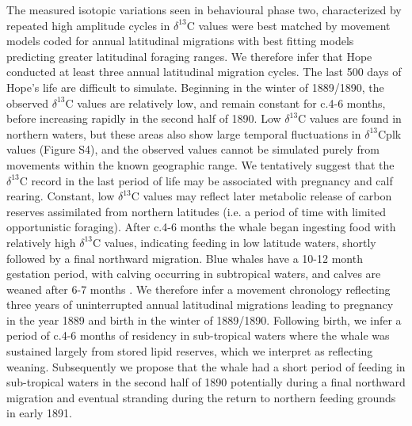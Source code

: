 \documentclass[a4paper,12pt]{article}
\begin{document}
The measured isotopic variations seen in behavioural phase two, characterized by repeated high amplitude cycles in $\delta^{13}$C values were best matched by movement models coded for annual latitudinal migrations with best fitting models predicting greater latitudinal foraging ranges. 
We therefore infer that Hope conducted at least three annual latitudinal migration cycles.
The last 500 days of Hope's life are difficult to simulate. 
Beginning in the winter of 1889/1890, the observed $\delta^{13}$C values are relatively low, and remain constant for c.4-6 months, before increasing rapidly in the second half of 1890. Low $\delta^{13}$C values are found in northern waters, but these areas also show large temporal fluctuations in $\delta^{13}$Cplk values (Figure S4), and the observed values cannot be simulated purely from movements within the known geographic range. 
We tentatively suggest that the $\delta^{13}$C record in the last period of life may be associated with pregnancy and calf rearing. 
Constant, low $\delta^{13}$C values may reflect later metabolic release of carbon reserves assimilated from northern latitudes (i.e. a period of time with limited opportunistic foraging). 
After c.4-6 months the whale began ingesting food with relatively high $\delta^{13}$C values, indicating feeding in low latitude waters, shortly followed by a final northward migration. 
Blue whales have a 10-12 month gestation period, with calving occurring in subtropical waters, and calves are weaned after 6-7 months \citep{handbook}.
We therefore infer a movement chronology reflecting three years of uninterrupted annual latitudinal migrations leading to pregnancy in the year 1889 and birth in the winter of 1889/1890. 
Following birth, we infer a period of c.4-6 months of residency in sub-tropical waters where the whale was sustained largely from stored lipid reserves, which we interpret as reflecting weaning. 
Subsequently we propose that the whale had a short period of feeding in sub-tropical waters in the second half of 1890 potentially during a final northward migration and eventual stranding during the return to northern feeding grounds in early 1891.
\end{document}
